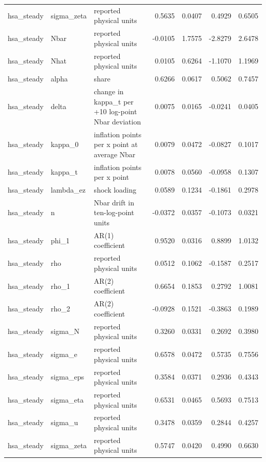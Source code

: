 \begin{tabular}{lllrrrr}
hsa\_steady & sigma\_zeta & reported physical units & 0.5635 & 0.0407 & 0.4929 & 0.6505 \\
hsa\_steady & Nbar & reported physical units & -0.0105 & 1.7575 & -2.8279 & 2.6478 \\
hsa\_steady & Nhat & reported physical units & 0.0105 & 0.6264 & -1.1070 & 1.1969 \\
hsa\_steady & alpha & share & 0.6266 & 0.0617 & 0.5062 & 0.7457 \\
hsa\_steady & delta & change in kappa\_t per +10 log-point Nbar deviation & 0.0075 & 0.0165 & -0.0241 & 0.0405 \\
hsa\_steady & kappa\_0 & inflation points per x point at average Nbar & 0.0079 & 0.0472 & -0.0827 & 0.1017 \\
hsa\_steady & kappa\_t & inflation points per x point & 0.0078 & 0.0560 & -0.0958 & 0.1307 \\
hsa\_steady & lambda\_ez & shock loading & 0.0589 & 0.1234 & -0.1861 & 0.2978 \\
hsa\_steady & n & Nbar drift in ten-log-point units & -0.0372 & 0.0357 & -0.1073 & 0.0321 \\
hsa\_steady & phi\_1 & AR(1) coefficient & 0.9520 & 0.0316 & 0.8899 & 1.0132 \\
hsa\_steady & rho & reported physical units & 0.0512 & 0.1062 & -0.1587 & 0.2517 \\
hsa\_steady & rho\_1 & AR(2) coefficient & 0.6654 & 0.1853 & 0.2792 & 1.0081 \\
hsa\_steady & rho\_2 & AR(2) coefficient & -0.0928 & 0.1521 & -0.3863 & 0.1989 \\
hsa\_steady & sigma\_N & reported physical units & 0.3260 & 0.0331 & 0.2692 & 0.3980 \\
hsa\_steady & sigma\_e & reported physical units & 0.6578 & 0.0472 & 0.5735 & 0.7556 \\
hsa\_steady & sigma\_eps & reported physical units & 0.3584 & 0.0371 & 0.2936 & 0.4343 \\
hsa\_steady & sigma\_eta & reported physical units & 0.6531 & 0.0465 & 0.5693 & 0.7513 \\
hsa\_steady & sigma\_u & reported physical units & 0.3478 & 0.0359 & 0.2844 & 0.4257 \\
hsa\_steady & sigma\_zeta & reported physical units & 0.5747 & 0.0420 & 0.4990 & 0.6630 \\
\bottomrule
\end{tabular}

